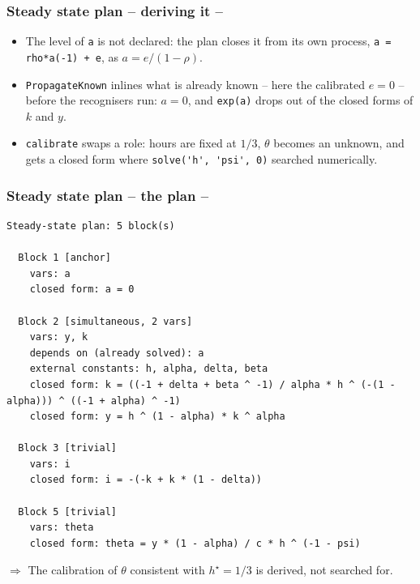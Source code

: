 \documentclass[10pt,slidestop]{beamer}
\theoremstyle{plain}
\begin{document}
\begin{frame}[c,fragile]
  \frametitle{Steady state plan -- deriving it --}

  

  \medskip

  \begin{itemize}

  \item The level of \verb|a| is not declared: the plan closes it from its own
    process, \verb|a = rho*a(-1) + e|, as $a = e/(1-\rho)$.\newline

  \item \verb+PropagateKnown+ inlines what is already known -- here the calibrated
    $e=0$ -- before the recognisers run: $a=0$, and \verb|exp(a)| drops out of the
    closed forms of $k$ and $y$.\newline

  \item \verb+calibrate+ swaps a role: hours are fixed at $1/3$, $\theta$
    becomes an unknown, and gets a closed form where \verb+solve('h', 'psi', 0)+
    searched numerically.

  \end{itemize}

\end{frame}


\begin{frame}[c,fragile]
  \frametitle{Steady state plan -- the plan --}

  \begin{lstlisting}[style=MatlabConsole,basicstyle=\ttfamily\scriptsize]
Steady-state plan: 5 block(s)

  Block 1 [anchor]
    vars: a
    closed form: a = 0

  Block 2 [simultaneous, 2 vars]
    vars: y, k
    depends on (already solved): a
    external constants: h, alpha, delta, beta
    closed form: k = ((-1 + delta + beta ^ -1) / alpha * h ^ (-(1 - alpha))) ^ ((-1 + alpha) ^ -1)
    closed form: y = h ^ (1 - alpha) * k ^ alpha

  Block 3 [trivial]
    vars: i
    closed form: i = -(-k + k * (1 - delta))

  Block 5 [trivial]
    vars: theta
    closed form: theta = y * (1 - alpha) / c * h ^ (-1 - psi)
  \end{lstlisting}

  $\Rightarrow$ The calibration of $\theta$ consistent with $h^{\star}=1/3$ is
  derived, not searched for.

\end{frame}
\end{document}
